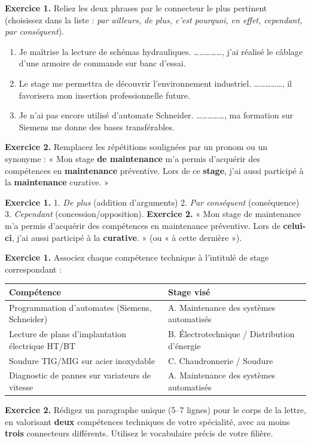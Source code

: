 \documentclass[11pt]{article}
\begin{document}
\begin{exercice}
\textbf{Exercice 1.} Reliez les deux phrases par le connecteur le plus pertinent (choisissez dans la liste : \textit{par ailleurs, de plus, c'est pourquoi, en effet, cependant, par conséquent}).
\begin{enumerate}
\item Je maîtrise la lecture de schémas hydrauliques. \dots\dots\dots\dots\dots, j'ai réalisé le câblage d'une armoire de commande sur banc d'essai.
\item Le stage me permettra de découvrir l'environnement industriel. \dots\dots\dots\dots\dots, il favorisera mon insertion professionnelle future.
\item Je n'ai pas encore utilisé d'automate Schneider. \dots\dots\dots\dots\dots, ma formation sur Siemens me donne des bases transférables.
\end{enumerate}
\textbf{Exercice 2.} Remplacez les répétitions soulignées par un pronom ou un synonyme :
« Mon stage \textbf{de maintenance} m'a permis d'acquérir des compétences en \textbf{maintenance} préventive. Lors de ce \textbf{stage}, j'ai aussi participé à la \textbf{maintenance} curative. »
\end{exercice}

\begin{corrige}
\textbf{Exercice 1.} 1. \textit{De plus} (addition d'arguments) 2. \textit{Par conséquent} (conséquence) 3. \textit{Cependant} (concession/opposition).
\textbf{Exercice 2.} « Mon stage de maintenance m'a permis d'acquérir des compétences en maintenance préventive. Lors de \textbf{celui-ci}, j'ai aussi participé à la \textbf{curative}. » (ou « à cette dernière »).
\end{corrige}

\begin{exercice}
\textbf{Exercice 1.} Associez chaque compétence technique à l'intitulé de stage correspondant :
\begin{center}
\begin{tabular}{|l|l|}\hline
\textbf{Compétence} & \textbf{Stage visé} \\ \hline
Programmation d'automates (Siemens, Schneider) & A. Maintenance des systèmes automatisés \\ \hline
Lecture de plans d'implantation électrique HT/BT & B. Électrotechnique / Distribution d'énergie \\ \hline
Soudure TIG/MIG sur acier inoxydable & C. Chaudronnerie / Soudure \\ \hline
Diagnostic de pannes sur variateurs de vitesse & A. Maintenance des systèmes automatisés \\ \hline
\end{tabular}
\end{center}
\textbf{Exercice 2.} Rédigez un paragraphe unique (5--7 lignes) pour le corps de la lettre, en valorisant \textbf{deux} compétences techniques de votre spécialité, avec au moins \textbf{trois} connecteurs différents. Utilisez le vocabulaire précis de votre filière.
\end{exercice}
\end{document}
